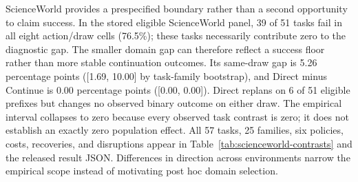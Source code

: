 ScienceWorld provides a prespecified boundary rather than a second opportunity to claim success. In the stored eligible ScienceWorld panel, 39 of 51 tasks fail in all eight action/draw cells (76.5\%); these tasks necessarily contribute zero to the diagnostic gap. The smaller domain gap can therefore reflect a success floor rather than more stable continuation outcomes. Its same-draw gap is 5.26 percentage points ([1.69, 10.00] by task-family bootstrap), and Direct minus Continue is 0.00 percentage points ([0.00, 0.00]). Direct replans on 6 of 51 eligible prefixes but changes no observed binary outcome on either draw. The empirical interval collapses to zero because every observed task contrast is zero; it does not establish an exactly zero population effect. All 57 tasks, 25 families, six policies, costs, recoveries, and disruptions appear in Table~\ref{tab:scienceworld-contrasts} and the released result JSON. Differences in direction across environments narrow the empirical scope instead of motivating post hoc domain selection.
